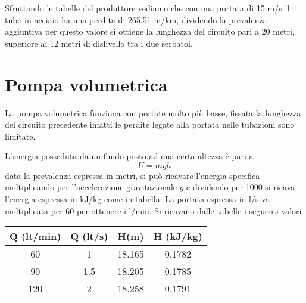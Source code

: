 \documentclass[a4paper,12pt]{article}
\begin{document}
Sfruttando le tabelle del produttore vediamo che con una portata di 15 m/s il tubo in acciaio ha una perdita di 265.51 m/km, dividendo la prevalenza aggiuntiva
per questo valore si ottiene la lunghezza del circuito pari a 20 metri, superiore ai 12 metri di dislivello tra i due serbatoi.

\section{Pompa volumetrica}
La pompa volumetrica funziona con portate molto più basse, fissata la lunghezza del circuito precedente infatti le perdite legate alla portata nelle tubazioni sono limitate.

L'energia posseduta da un fluido posto ad una certa altezza è pari a 
\begin{equation}
    U = mgh
\end{equation}
data la prevalenza espressa in metri, si può ricavare l'energia specifica moltiplicando per l'accelerazione gravitazionale $g$ e dividendo per 1000 si ricava 
l'energia espressa in kJ/kg come in tabella. La portata espressa in l/s va moltiplicata per 60 per ottenere i l/min.
Si ricavano dalle tabelle i seguenti valori
\begin{center}
    \begin{tabular}{c|c|c|c}
        Q (lt/min)  &   Q (lt/s)&H(m)   &H (kJ/kg)  \\ \hline
        60          &   1       &18.165 &0.1782     \\ \hline
        90          &   1.5     &18.205 &0.1785     \\ \hline
        120         &   2       &18.258 &0.1791     \\ \hline
    \end{tabular}
    
\end{center}
\end{document}
